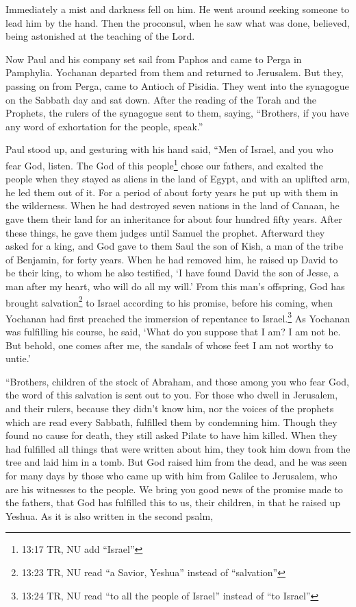 Immediately a mist and darkness fell on him. He went around seeking someone to lead him by
the hand.
\myverse{}Then the proconsul, when he saw what was done, believed, being astonished
at the teaching of the Lord.

\myverse{}Now Paul and his company set sail from Paphos and came to Perga
in Pamphylia. Yochanan departed from them and returned to Jerusalem.
\myverse{}But they, passing on from Perga, came to Antioch of Pisidia. They went into
the synagogue on the Sabbath day and sat down.
\myverse{}After the reading of the Torah and the Prophets, the rulers of the synagogue
sent to them, saying, “Brothers, if you have any word of exhortation for the people, speak.”

\myverse{}Paul stood up, and gesturing with his hand said, “Men of Israel,
and you who fear God, listen.
\myverse{}The God of this people\footnote{13:17 TR, NU add “Israel”} chose our fathers, and exalted the people when they stayed as aliens
in the land of Egypt, and with an uplifted arm, he led them out of it.
\myverse{}For a period of about forty years he put up with them in the wilderness.
\myverse{}When he had destroyed seven nations in the land of Canaan, he gave them their
land for an inheritance for about four hundred fifty years.
\myverse{}After these things, he gave them judges until Samuel the prophet.
\myverse{}Afterward they asked for a king, and God gave to them Saul the son of Kish,
a man of the tribe of Benjamin, for forty years.
\myverse{}When he had removed him, he raised up David to be their king, to whom he
also testified, ‘I have found David the son of Jesse, a man after my heart, who will do all my will.’
\myverse{}From this man’s offspring, God has brought salvation\footnote{13:23 TR, NU read “a Savior, Yeshua” instead of “salvation”} to Israel according to his promise,
\myverse{}before his coming, when Yochanan had first preached the immersion of repentance
to Israel.\footnote{13:24 TR, NU read “to all the people of Israel” instead of “to Israel”}
\myverse{}As Yochanan was fulfilling his course, he said, ‘What do you suppose that
I am? I am not he. But behold, one comes after me, the sandals of whose feet I am not worthy to untie.’

\myverse{}“Brothers, children of the stock of Abraham, and those among
you who fear God, the word of this salvation is sent out to you.
\myverse{}For those who dwell in Jerusalem, and their rulers, because they didn’t know
him, nor the voices of the prophets which are read every Sabbath, fulfilled them by condemning him.
\myverse{}Though they found no cause for death, they still asked Pilate to have him
killed.
\myverse{}When they had fulfilled all things that were written about him, they took
him down from the tree and laid him in a tomb.
\myverse{}But God raised him from the dead,
\myverse{}and he was seen for many days by those who came up with him from Galilee
to Jerusalem, who are his witnesses to the people.
\myverse{}We bring you good news of the promise made to the fathers,
\myverse{}that God has fulfilled this to us, their children, in that he raised up Yeshua.
As it is also written in the second psalm,

